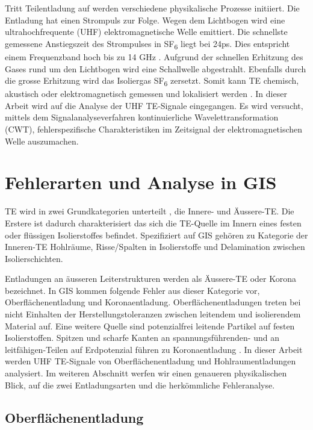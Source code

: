 \begin{refsection}
Tritt Teilentladung auf werden verschiedene  physikalische Prozesse initiiert. 
Die Entladung hat einen Strompuls zur Folge.
Wegen dem Lichtbogen wird eine ultrahochfrequente (UHF) elektromagnetische Welle emittiert.
Die schnellste gemessene Anstiegszeit des Strompulses in SF\textsubscript{6} liegt bei 24ps.
Dies entspricht einem Frequenzband hoch bis zu 14 GHz \cite{skript:Judd24ps} . 
Aufgrund der schnellen Erhitzung des Gases rund um den Lichtbogen wird eine Schallwelle abgestrahlt. 
Ebenfalls durch die grosse Erhitzung wird das Isoliergas SF\textsubscript{6} zersetzt. 
Somit kann TE chemisch, akustisch oder elektromagnetisch gemessen und lokalisiert werden \cite{skript:StatusReviewPDMeasurement}.
In dieser Arbeit wird auf die Analyse der UHF TE-Signale eingegangen.
Es wird versucht, mittels dem Signalanalyseverfahren kontinuierliche Wavelettransformation (CWT), fehlerspezifische Charakteristiken im Zeitsignal der elektromagnetischen Welle auszumachen.

\section{Fehlerarten und Analyse in GIS}

TE wird in zwei Grundkategorien unterteilt \cite{buch:Kuchler}, die Innere- und Äussere-TE. 
Die Erstere ist dadurch charakterisiert das sich die TE-Quelle im Innern eines festen oder flüssigen Isolierstoffes befindet. 
Spezifiziert auf GIS gehören zu Kategorie der Inneren-TE Hohlräume, Risse/Spalten in Isolierstoffe und Delamination zwischen Isolierschichten.
 
Entladungen an äusseren Leiterstrukturen werden als Äussere-TE oder Korona bezeichnet. 
In GIS kommen folgende Fehler aus dieser Kategorie vor, Oberflächenentladung und Koronaentladung. 
Oberflächenentladungen treten bei nicht Einhalten der Herstellungstoleranzen zwischen leitendem und isolierendem Material auf.
Eine weitere Quelle sind potenzialfrei leitende Partikel auf festen Isolierstoffen.
Spitzen und scharfe Kanten an spannungsführenden- und an leitfähigen-Teilen auf Erdpotenzial führen zu Koronaentladung \cite{buch:Kuchler, skript:AeussreTE, skript:InnereTE}. 
In dieser Arbeit werden UHF TE-Signale von Oberflächenentladung und Hohlraumentladungen analysiert. 
Im weiteren Abschnitt werfen wir einen genaueren physikalischen Blick, auf die zwei Entladungsarten und die herkömmliche Fehleranalyse.

\subsection{Oberflächenentladung}


\end{refsection}
